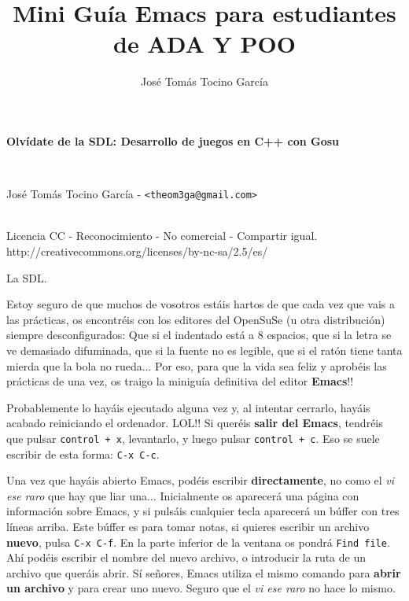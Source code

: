 \documentclass{article}
\title{Mini Guía Emacs para estudiantes de ADA Y POO}
\author{José Tomás Tocino García}
\date{}
\begin{document}
\pagestyle{empty}
\begin{center}
\begin{Large}\textbf{Olvídate de la SDL: Desarrollo de juegos en C++ con Gosu}\end{Large}\\
\begin{large}José Tomás Tocino García - \texttt{<theom3ga@gmail.com>}\end{large}\\[0.1cm]

{\small Licencia CC - Reconocimiento - No comercial - Compartir igual.\\
http://creativecommons.org/licenses/by-nc-sa/2.5/es/}
 
\end{center}

La SDL. 


Estoy seguro de que muchos de vosotros estáis hartos de que cada vez que vais a las prácticas, os encontréis con los editores del OpenSuSe (u otra distribución) siempre desconfigurados: Que si el indentado está a 8 espacios, que si la letra se ve demasiado difuminada, que si la fuente no es legible, que si el ratón tiene tanta mierda que la bola no rueda... Por eso, para que la vida sea feliz y aprobéis las prácticas de una vez, os traigo la miniguía definitiva del editor \textbf{Emacs}!! 

Probablemente lo hayáis ejecutado alguna vez y, al intentar cerrarlo, hayáis acabado reiniciando el ordenador. LOL!! Si queréis \textbf{salir del Emacs}, tendréis que pulsar \texttt{control + x}, levantarlo, y luego pulsar \texttt{control + c}. Eso se suele escribir de esta forma: \texttt{C-x C-c}. 

Una vez que hayáis abierto Emacs, podéis escribir \textbf{directamente}, no como el \textit{vi ese raro} que hay que liar una... Inicialmente os aparecerá una página con información sobre Emacs, y si pulsáis cualquier tecla aparecerá un búffer con tres líneas arriba. Este búffer es para tomar notas, si quieres escribir un archivo \textbf{nuevo}, pulsa \texttt{C-x C-f}. En la parte inferior de la ventana os pondrá \texttt{Find file}. Ahí podéis escribir el nombre del nuevo archivo, o introducir la ruta de un archivo que queráis abrir. Sí señores, Emacs utiliza el mismo comando para \textbf{abrir un archivo} y para crear uno nuevo. Seguro que el \textit{vi ese raro} no hace lo mismo.
\end{document}
